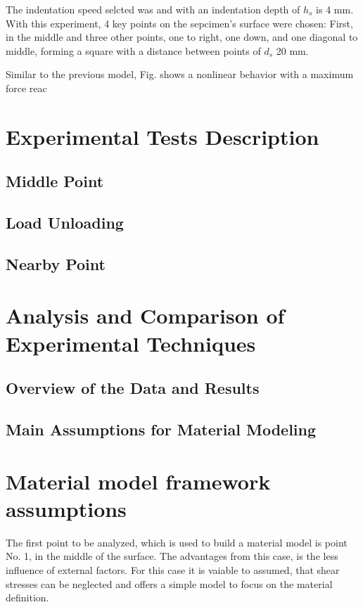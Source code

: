The indentation speed selcted was %
and with an indentation depth of \(h_s\) is 4 mm. With this experiment, 4 key points on 
the sepcimen's surface were chosen: First, in the middle and three other points, one to right, 
one down, and one diagonal to middle, forming a square with a distance between points 
of \(d_s\) 20 mm. %




Similar to the previous model, Fig. %
shows a nonlinear behavior with a maximum force reac

\section{Experimental Tests Description}

\subsection{Middle Point}
\subsection{Load Unloading}
\subsection{Nearby Point}


\section{Analysis and Comparison of Experimental Techniques}

\subsection{Overview of the Data and Results}

\subsection{Main Assumptions for Material Modeling}



\section{Material model framework assumptions}

The first point to be analyzed, which is used to build a material model is point No. 1,
in the middle of the surface. The advantages from this case, is the less influence of
external factors. For this case it is vaiable to assumed, that shear stresses can be 
neglected and offers a simple model to focus on the material definition.

